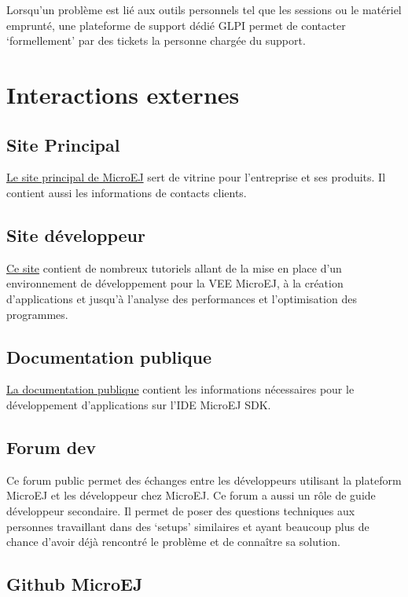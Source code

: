 \documentclass[french,a4paper,12pt]{report}
\begin{document}
Lorsqu’un problème est lié aux outils personnels tel que les sessions ou le matériel emprunté, une plateforme de support dédié GLPI permet de contacter ‘formellement’ par des tickets la personne chargée du support.

\section{Interactions externes}
\subsection{Site Principal}

\href{https://www.microej.com/}{Le site principal de MicroEJ} sert de vitrine pour l'entreprise et ses produits. Il contient aussi les informations de contacts clients.

\subsection{Site développeur}

\href{https://developer.microej.com/}{Ce site} contient de nombreux tutoriels allant de la mise en place d'un environnement de développement pour la VEE MicroEJ, à la création d'applications et jusqu'à l'analyse des performances et l'optimisation des programmes.

\subsection{Documentation publique}

\href{https://docs.microej.com/en/latest/}{La documentation publique} contient les informations nécessaires pour le développement d’applications sur l’IDE MicroEJ SDK.

\subsection{Forum dev}

Ce forum public permet des échanges entre les développeurs utilisant la plateform MicroEJ et les développeur chez MicroEJ. Ce forum a aussi un rôle de guide développeur secondaire. Il permet de poser des questions techniques aux personnes travaillant dans des ‘setups’ similaires et ayant beaucoup plus de chance d’avoir déjà rencontré le problème et de connaître sa solution.

\subsection{Github MicroEJ}
\end{document}
